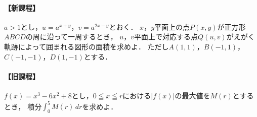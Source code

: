 \documentclass[../../main.tex]{subfiles}
\begin{document}
\paragraph{【新課程】}
$a>1$とし，$u=a^{x+y}$，$v=a^{2x-y}$とおく．
$x$，$y$平面上の点$P(x,y)$が正方形$ABCD$の周に沿って一周するとき，
$u$，$v$平面上で対応する点$Q(u,v)$がえがく軌跡によって囲まれる図形の面積を求めよ．
ただし$A(1,1)$，$B(-1,1)$，$C(-1,-1)$，$D(1,-1)$とする．

\paragraph{【旧課程】}
$f(x)=x^3-6x^2+8$とし，$0 \leqq x \leqq r$における$|f(x)|$の最大値を$M(r)$とするとき，
積分$\displaystyle\int_0^5M(r)\,dr$を求めよ．
\end{document}
